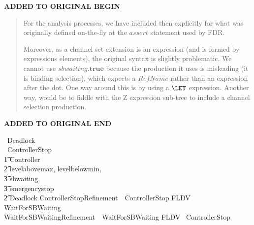 \documentclass{report}
\newcommand{\true}{\ensuremath{\mathbf{true}}}
\newcommand{\false}{\ensuremath{\mathbf{false}}}
\newenvironment{addedstuff}{\begin{flushleft}\textbf{ADDED TO ORIGINAL BEGIN}\begin{quote}\begin{minipage}{.8\textwidth}}{\end{minipage}\end{quote}\textbf{ADDED TO ORIGINAL END}\end{flushleft}}
\begin{document}
\begin{addedstuff}
   For the analysis processes, we have included then explicitly for
   what was originally defined on-the-fly at the $assert$ statement
   used by FDR.

   Moreover, as a channel set extension is an expression (and is formed by expressions elements),
   the original syntax is slightly problematic. We cannot use $sbwaiting.\true$ because the production
   it uses is misleading (it is binding selection), which expects a $RefName$ rather than an expression
   after the dot. One way around this is by using a $\LET$ expression. Another way, would be to
   fiddle with the Z expression sub-tree to include a channel selection production.
\end{addedstuff}
%
\begin{circus}
   \circprocess\ Deadlock \circdef \circbegin \circspot \Stop \circend \\
   \circprocess\ ControllerStop \circdef \\
        \t1 Controller \\
%
        \t2 \lpar \lchanset levelabovemax, levelbelowmin, \\
                             \t3  sbwaiting, \\
                            \t3  emergencystop \rchanset \rpar \\
        \t2 Deadlock
   \also
   ControllerStopRefinement\   \circassertref\ ControllerStop \circrefines FLDV~ WaitForSBWaiting \\
   WaitForSBWaitingRefinement\ \circassertref\ WaitForSBWaiting \circrefines FLDV~ ControllerStop
\end{circus}
\end{document}
